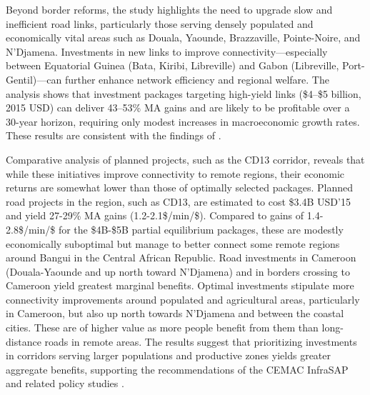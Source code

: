 \documentclass[a4paper]{article}
\begin{document}
Beyond border reforms, the study highlights the need to upgrade slow and inefficient road links, particularly those serving densely populated and economically vital areas such as Douala, Yaounde, Brazzaville, Pointe-Noire, and N'Djamena. Investments in new links to improve connectivity—especially between Equatorial Guinea (Bata, Kiribi, Libreville) and Gabon (Libreville, Port-Gentil)—can further enhance network efficiency and regional welfare. The analysis shows that investment packages targeting high-yield links (\$4--\$5 billion, 2015 USD) can deliver 43--53\% MA gains and are likely to be profitable over a 30-year horizon, requiring only modest increases in macroeconomic growth rates. These results are consistent with the findings of \citet{krantz2024optimal}. %
\newline


Comparative analysis of planned projects, such as the CD13 corridor, reveals that while these initiatives improve connectivity to remote regions, their economic returns are somewhat lower than those of optimally selected packages. Planned road projects in the region, such as CD13, are estimated to cost \$3.4B USD'15 and yield 27-29\% MA gains (1.2-2.1\$/min/\$). Compared to gains of 1.4-2.8\$/min/\$ for the \$4B-\$5B partial equilibrium packages, these are modestly economically suboptimal but manage to better connect some remote regions around Bangui in the Central African Republic. Road investments in Cameroon (Douala-Yaounde and up north toward N'Djamena) and in borders crossing to Cameroon yield greatest marginal benefits. Optimal investments stipulate more connectivity improvements around populated and agricultural areas, particularly in Cameroon, but also up north towards N'Djamena and between the coastal cities. These are of higher value as more people benefit from them than long-distance roads in remote areas. The results suggest that prioritizing investments in corridors serving larger populations and productive zones yields greater aggregate benefits, supporting the recommendations of the CEMAC InfraSAP and related policy studies \citep{WorldBank2025_CEMAC_InfrastructureSAP, AfricanUnion2021_AfricanIntegrationReport}.\newline 
\end{document}
